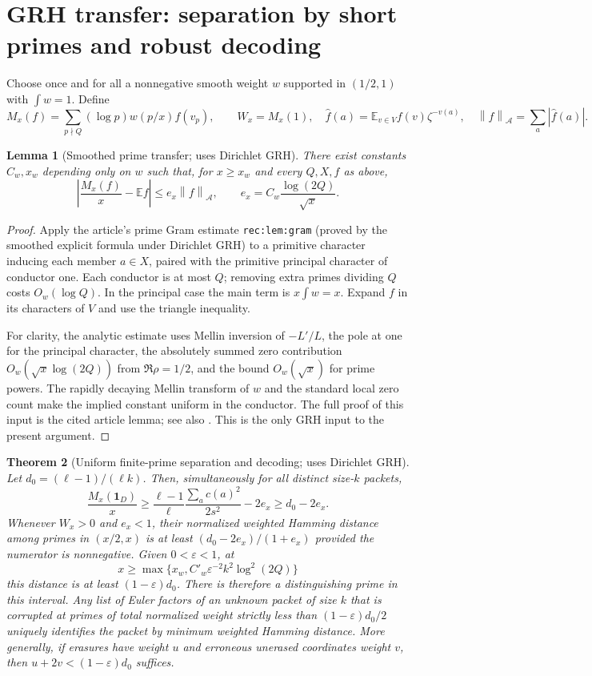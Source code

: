 \documentclass[11pt]{article}
\newtheorem{theorem}{Theorem}[section]
\newtheorem{lemma}[theorem]{Lemma}
\theoremstyle{remark}\newtheorem{remark}[theorem]{Remark}
\newcommand{\E}{\mathbb E}
\newcommand{\1}{\mathbf 1}
\newcommand{\norm}[1]{\left\lVert#1\right\rVert}
\begin{document}
\section{GRH transfer: separation by short primes and robust decoding}
Choose once and for all a nonnegative smooth weight $w$ supported in $(1/2,1)$ with $\int w=1$. Define
\[
 M_x(f)=\sum_{p\nmid Q}(\log p)w(p/x)f(v_p),\qquad
 W_x=M_x(1),\quad \widehat f(a)=\E_{v\in V} f(v)\zeta^{-v(a)},\quad
 \norm f_{\mathcal A}=\sum_a|\widehat f(a)|.
\]
\begin{lemma}[Smoothed prime transfer; uses Dirichlet GRH]\label{lem:transfer}
There exist constants $C_w,x_w$ depending only on $w$ such that, for $x\ge x_w$ and every $Q,X,f$ as above,
\[
 \left|\frac{M_x(f)}x-\E f\right|\le e_x\norm f_{\mathcal A},
 \qquad e_x=C_w\frac{\log(2Q)}{\sqrt{x}}.
\]
\end{lemma}
\begin{proof}
Apply the article's prime Gram estimate \texttt{rec:lem:gram} (proved by the smoothed explicit formula under Dirichlet GRH) to a primitive character inducing each member $a\in X$, paired with the primitive principal character of conductor one. Each conductor is at most $Q$; removing extra primes dividing $Q$ costs $O_w(\log Q)$. In the principal case the main term is $x\int w=x$. Expand $f$ in its characters of $V$ and use the triangle inequality.

For clarity, the analytic estimate uses Mellin inversion of $-L'/L$, the pole at one for the principal character, the absolutely summed zero contribution $O_w(\sqrt{x}\log(2Q))$ from $\Re\rho=1/2$, and the bound $O_w(\sqrt{x})$ for prime powers. The rapidly decaying Mellin transform of $w$ and the standard local zero count make the implied constant uniform in the conductor. The full proof of this input is the cited article lemma; see also \cite{davenport,mv}. This is the only GRH input to the present argument.
\end{proof}
\begin{theorem}[Uniform finite-prime separation and decoding; uses Dirichlet GRH]\label{thm:finite}
Let $d_0=(\ell-1)/(\ell k)$. Then, simultaneously for all distinct size-$k$ packets,
\begin{equation}\label{eq:finite}
 \frac{M_x(\1_D)}{x}\ge
 \frac{\ell-1}{\ell}\frac{\sum_a c(a)^2}{2s^2}-2e_x\ge d_0-2e_x.
\end{equation}
Whenever $W_x>0$ and $e_x<1$, their normalized weighted Hamming distance among primes in $(x/2,x)$ is at least $(d_0-2e_x)/(1+e_x)$ provided the numerator is nonnegative. Given $0<\varepsilon<1$, at
\[
 x\ge\max\{x_w, C'_w\varepsilon^{-2} k^2\log^2(2Q)\}
\]
this distance is at least $(1-\varepsilon)d_0$. There is therefore a distinguishing prime in this interval. Any list of Euler factors of an unknown packet of size $k$ that is corrupted at primes of total normalized weight strictly less than $(1-\varepsilon)d_0/2$ uniquely identifies the packet by minimum weighted Hamming distance. More generally, if erasures have weight $u$ and erroneous unerased coordinates weight $v$, then $u+2v<(1-\varepsilon)d_0$ suffices.
\end{theorem}
\end{document}
